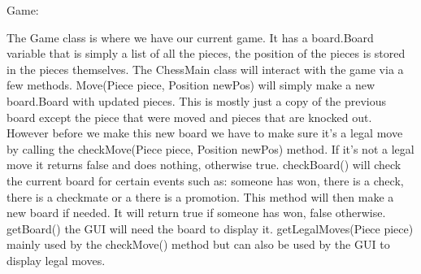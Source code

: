 \documentclass{article}
\begin{document}
        \noindent
        Game:\\
        \begin{outline}
            The Game class is where we have our current game. It has a board.Board
            variable that is simply a list of all the pieces, the position
            of the pieces is stored in the pieces themselves. The ChessMain class
            will interact with the game via a few methods.
            \1 Move(Piece piece, Position newPos) will simply make a new board.Board
            with updated pieces. This is mostly just a copy of the previous board
            except the piece that were moved and pieces that are knocked out.
            However before we make this new board we have to make sure it’s a
            legal move by calling the checkMove(Piece piece, Position newPos)
            method. If it’s not a legal move it returns false and does nothing,
            otherwise true.
            \1 checkBoard() will check the current board for certain events 
            such as: someone has won, there is a check, there is a checkmate or 
            a there is a promotion. This method will then make a new board if 
            needed. It will return true if someone has won, false otherwise.
            \1 getBoard() the GUI will need the board to display it.
            \1 getLegalMoves(Piece piece) mainly used by the checkMove() method
            but can also be used by the GUI to display legal moves.
        \end{outline}

    
\end{document}

